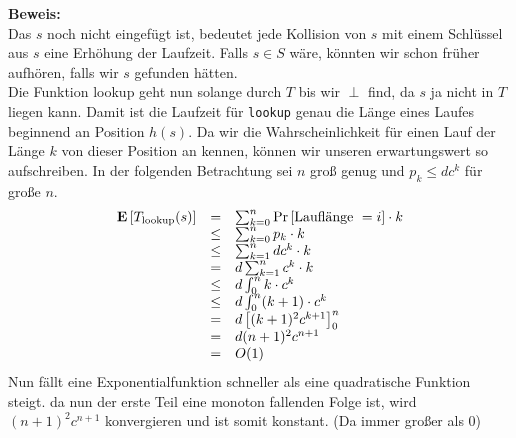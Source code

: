 \documentclass[11pt,a4paper,ngerman]{article}
\newcommand{\erw}[1]{\text{\bfseries E} \left[ #1 \right]}
\newcommand{\prob}[1]{\text{Pr}\left[ #1 \right]}
\begin{document}
\noindent\textbf{Beweis:}\\
Das $s$ noch nicht eingefügt ist, bedeutet jede Kollision von $s$ mit einem Schlüssel aus $s$ eine Erhöhung der Laufzeit. Falls $s \in S$ wäre,
könnten wir schon früher aufhören, falls wir $s$ gefunden hätten.\\

Die Funktion lookup geht nun solange durch $T$ bis wir $\perp$ find, da $s$ ja nicht in $T$ liegen kann. Damit ist die Laufzeit für \lstinline|lookup| genau die Länge eines Laufes beginnend an Position $h(s)$. Da wir die Wahrscheinlichkeit für einen Lauf der Länge $k$ von dieser Position an kennen, können wir unseren erwartungswert so aufschreiben. In der folgenden Betrachtung sei $n$ groß genug und $p_k \leq d c^k$ für große $n$.
$$\begin{array}{rcl}
	\erw{T_\text{lookup}(s)} &=& \sum_{k=0}^n \prob{\text{Lauflänge }=i} \cdot k\\
					&\leq& \sum_{k=0}^n p_k \cdot k\\
					&\leq& \sum_{k=1}^n d c^k\cdot k\\
					&=& d \sum_{k=1}^n c^k \cdot k\\
					&\leq& d\int_0^{n} k \cdot c^k\\
					&\leq& d\int_0^{n} (k+1) \cdot c^k\\
					&=& d\left[ (k+1)^2 c^{k+1} \right]_0^{n}\\
					&=& d(n+1)^2 c^{n+1}\\
					&=& O(1)
\end{array}$$
Nun fällt eine Exponentialfunktion schneller als eine quadratische Funktion steigt. da nun der erste Teil eine monoton fallenden Folge ist, wird 
$(n+1)^2 c^{n+1}$ konvergieren und ist somit konstant. (Da immer großer als 0)
\label{LastPage}
\end{document}
